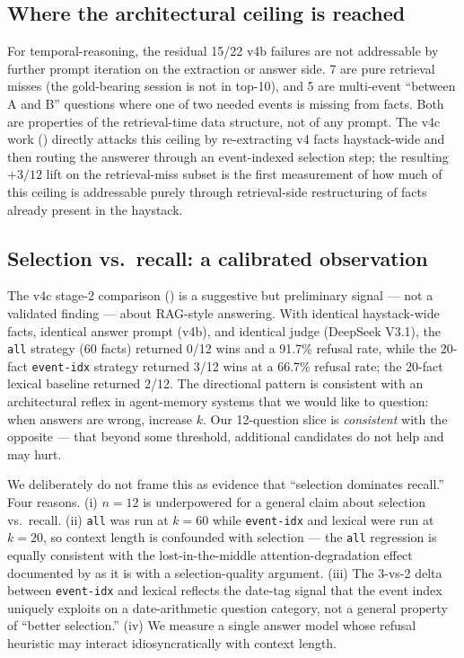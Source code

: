 \documentclass{article}
\begin{document}
\subsection{Where the architectural ceiling is reached}

For temporal-reasoning, the residual 15/22 v4b failures are not addressable by further prompt iteration on the extraction or answer side. 7 are pure retrieval misses (the gold-bearing session is not in top-10), and 5 are multi-event ``between A and B'' questions where one of two needed events is missing from facts. Both are properties of the retrieval-time data structure, not of any prompt. The v4c work () directly attacks this ceiling by re-extracting v4 facts haystack-wide and then routing the answerer through an event-indexed selection step; the resulting $+3/12$ lift on the retrieval-miss subset is the first measurement of how much of this ceiling is addressable purely through retrieval-side restructuring of facts already present in the haystack.

\subsection{Selection vs.\ recall: a calibrated observation}
\label{sec:selrecall}

The v4c stage-2 comparison () is a suggestive but preliminary signal --- not a validated finding --- about RAG-style answering. With identical haystack-wide facts, identical answer prompt (v4b), and identical judge (DeepSeek V3.1), the \texttt{all} strategy (60 facts) returned 0/12 wins and a 91.7\% refusal rate, while the 20-fact \texttt{event-idx} strategy returned 3/12 wins at a 66.7\% refusal rate; the 20-fact lexical baseline returned 2/12. The directional pattern is consistent with an architectural reflex in agent-memory systems that we would like to question: when answers are wrong, increase $k$. Our 12-question slice is \emph{consistent} with the opposite --- that beyond some threshold, additional candidates do not help and may hurt.

We deliberately do not frame this as evidence that ``selection dominates recall.'' Four reasons. (i) $n=12$ is underpowered for a general claim about selection vs.\ recall. (ii) \texttt{all} was run at $k=60$ while \texttt{event-idx} and lexical were run at $k=20$, so context length is confounded with selection --- the \texttt{all} regression is equally consistent with the lost-in-the-middle attention-degradation effect documented by \citet{liu2024lost} as it is with a selection-quality argument. (iii) The 3-vs-2 delta between \texttt{event-idx} and lexical reflects the date-tag signal that the event index uniquely exploits on a date-arithmetic question category, not a general property of ``better selection.'' (iv) We measure a single answer model whose refusal heuristic may interact idiosyncratically with context length.
\end{document}

